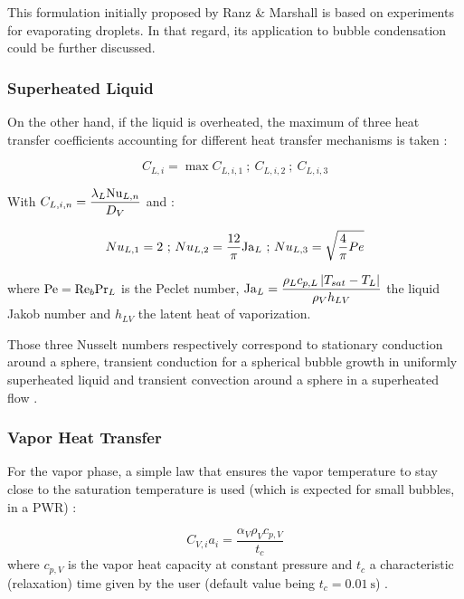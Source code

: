 \begin{remark*}{}
This formulation initially proposed by Ranz \& Marshall \cite{ranz_evaporation_1952} is based on experiments for evaporating droplets. In that regard, its application to bubble condensation could be further discussed. 
\end{remark*}


\subsubsection{Superheated Liquid}

On the other hand, if the liquid is overheated, the maximum of three heat transfer coefficients accounting for different heat transfer mechanisms is taken \cite{berne_analyse_1983}:

\begin{equation}
C_{L,i}=\max{C_{L,i,1}\ ;\ C_{L,i,2}\ ;\ C_{L,i,3}}
\label{eq:ncfd_supheat_L}
\end{equation}

With $C_{L,i,n}=\dfrac{\lambda_{L}\mathrm{Nu}_{L,n}}{D_{V}}$ and :

\begin{equation}
\label{eq:nusselt}
 Nu_{L,1}=2 \text{ ; } Nu_{L,2}=\frac{12}{\pi} \mathrm{Ja}_{L} \text{ ; }  Nu_{L,3}=\sqrt{\frac{4}{\pi}Pe} 
\end{equation}


where $\mathrm{Pe}=\mathrm{Re}_{b} \mathrm{Pr}_{L}$ is the Peclet number, $\mathrm{Ja}_{L}=\dfrac{ \rho_{L}c_{p,L}\left| T_{sat}-T_{L} \right|}{\rho_{V} h_{LV}} $ the liquid Jakob number and $h_{LV}$ the latent heat of vaporization. 

\npar

Those three Nusselt numbers respectively correspond to stationary conduction around a sphere, transient conduction for a spherical bubble growth in uniformly superheated liquid \cite{plesset_growth_1954} and transient convection around a sphere in a superheated flow \cite{ruckenstein_mass_1964}.

\subsubsection{Vapor Heat Transfer}

For the vapor phase, a simple law that ensures the vapor temperature to stay close to the saturation temperature is used (which is expected for small bubbles, \eg in a PWR) :

\begin{equation}
C_{V,i}a_{i}=\frac{\alpha_{V}\rho_{V}c_{p,V}}{t_{c}}
\label{eq:ncfd_vap_relaxation}
\end{equation}
where $c_{p,V}$ is the vapor heat capacity at constant pressure and $t_{c}$ a characteristic (relaxation) time given by the user (default value being $t_{c}=0.01\ \text{s}$) .


